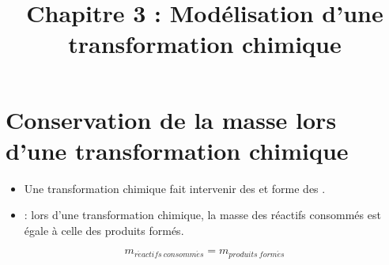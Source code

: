 \documentclass[xcolor={dvipsnames}]{beamer}
\title[CH3 : Transformation chimique]{Chapitre 3 : Modélisation d'une transformation chimique}
\author{}\institute{Collège S$^t$ Bernard}
\begin{document}
\begin{frame}
  \titlepage 
\end{frame}

\section{Conservation de la masse lors d'une transformation chimique}


%	
\begin{frame}

	\begin{alertblock}{}
		\begin{itemize}
			\item Une transformation chimique fait intervenir des  et forme des .
			\item {} : lors d'une transformation chimique, la masse des réactifs consommés est égale à celle des produits formés. \pause
		\end{itemize}
		  
		  \vspace*{-1cm}
		  
		  \begin{LARGE}
			  	
			  \begin{center}
			  	\begin{equation*}
			  		m_{r\acute{e}actifs \: consomm\acute{e}s} = m_{produits \: form\acute{e}s} 
			  	\end{equation*}
			  \end{center}
		  \end{LARGE}
	
		
	\end{alertblock}
\end{frame}
\end{document}
